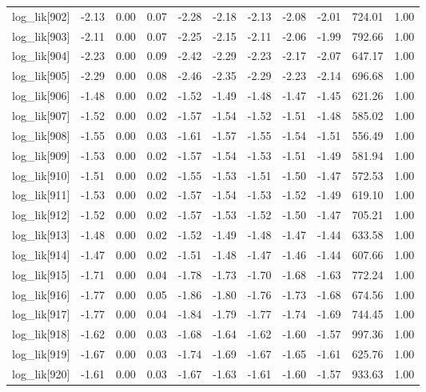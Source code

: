 \begin{table}[ht]
\begin{tabular}{rrrrrrrrrrr}
  log\_lik[902] & -2.13 & 0.00 & 0.07 & -2.28 & -2.18 & -2.13 & -2.08 & -2.01 & 724.01 & 1.00 \\ 
  log\_lik[903] & -2.11 & 0.00 & 0.07 & -2.25 & -2.15 & -2.11 & -2.06 & -1.99 & 792.66 & 1.00 \\ 
  log\_lik[904] & -2.23 & 0.00 & 0.09 & -2.42 & -2.29 & -2.23 & -2.17 & -2.07 & 647.17 & 1.00 \\ 
  log\_lik[905] & -2.29 & 0.00 & 0.08 & -2.46 & -2.35 & -2.29 & -2.23 & -2.14 & 696.68 & 1.00 \\ 
  log\_lik[906] & -1.48 & 0.00 & 0.02 & -1.52 & -1.49 & -1.48 & -1.47 & -1.45 & 621.26 & 1.00 \\ 
  log\_lik[907] & -1.52 & 0.00 & 0.02 & -1.57 & -1.54 & -1.52 & -1.51 & -1.48 & 585.02 & 1.00 \\ 
  log\_lik[908] & -1.55 & 0.00 & 0.03 & -1.61 & -1.57 & -1.55 & -1.54 & -1.51 & 556.49 & 1.00 \\ 
  log\_lik[909] & -1.53 & 0.00 & 0.02 & -1.57 & -1.54 & -1.53 & -1.51 & -1.49 & 581.94 & 1.00 \\ 
  log\_lik[910] & -1.51 & 0.00 & 0.02 & -1.55 & -1.53 & -1.51 & -1.50 & -1.47 & 572.53 & 1.00 \\ 
  log\_lik[911] & -1.53 & 0.00 & 0.02 & -1.57 & -1.54 & -1.53 & -1.52 & -1.49 & 619.10 & 1.00 \\ 
  log\_lik[912] & -1.52 & 0.00 & 0.02 & -1.57 & -1.53 & -1.52 & -1.50 & -1.47 & 705.21 & 1.00 \\ 
  log\_lik[913] & -1.48 & 0.00 & 0.02 & -1.52 & -1.49 & -1.48 & -1.47 & -1.44 & 633.58 & 1.00 \\ 
  log\_lik[914] & -1.47 & 0.00 & 0.02 & -1.51 & -1.48 & -1.47 & -1.46 & -1.44 & 607.66 & 1.00 \\ 
  log\_lik[915] & -1.71 & 0.00 & 0.04 & -1.78 & -1.73 & -1.70 & -1.68 & -1.63 & 772.24 & 1.00 \\ 
  log\_lik[916] & -1.77 & 0.00 & 0.05 & -1.86 & -1.80 & -1.76 & -1.73 & -1.68 & 674.56 & 1.00 \\ 
  log\_lik[917] & -1.77 & 0.00 & 0.04 & -1.84 & -1.79 & -1.77 & -1.74 & -1.69 & 744.45 & 1.00 \\ 
  log\_lik[918] & -1.62 & 0.00 & 0.03 & -1.68 & -1.64 & -1.62 & -1.60 & -1.57 & 997.36 & 1.00 \\ 
  log\_lik[919] & -1.67 & 0.00 & 0.03 & -1.74 & -1.69 & -1.67 & -1.65 & -1.61 & 625.76 & 1.00 \\ 
  log\_lik[920] & -1.61 & 0.00 & 0.03 & -1.67 & -1.63 & -1.61 & -1.60 & -1.57 & 933.63 & 1.00 \\ 

\end{tabular}
\end{table}
